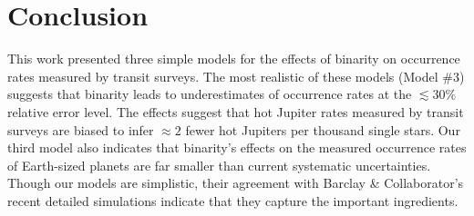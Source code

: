 \section{Conclusion}
\label{sec:conclusion}

This work presented three simple models for the effects of binarity on 
occurrence rates measured by transit surveys.
The most realistic of these models (Model \#3) suggests that binarity leads to 
underestimates of occurrence rates at the $\lesssim 30\%$ relative 
error level.
The effects suggest that hot Jupiter rates measured by transit surveys are 
biased to infer $\approx 2$ fewer hot Jupiters per thousand single stars.
Our third model also indicates that binarity's effects on the measured 
occurrence rates of Earth-sized planets are far smaller than current 
systematic uncertainties.
Though our models are simplistic, their agreement with Barclay \& 
Collaborator's recent detailed simulations indicate that they capture the 
important ingredients.
